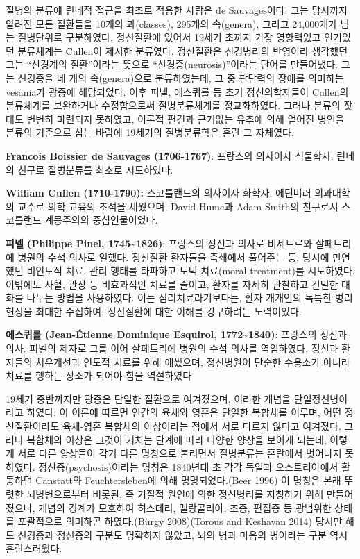 \documentclass[
]{article}
\begin{document}
질병의 분류에 린네적 접근을 최초로 적용한 사람은 de Sauvages이다. 그는
당시까지 알려진 모든 질환들을 10개의 과(classes), 295개의 속(genera),
그리고 24,000개가 넘는 질병단위로 구분하였다. 정신질환에 있어서 19세기
초까지 가장 영향력있고 인기있던 분류체계는 Cullen이 제시한 분류였다.
정신질환은 신경병리의 반영이라 생각했던 그는 ``신경계의 질환''이라는
뜻으로 ``신경증(neurosis)''이라는 단어를 만들어냈다. 그는 신경증을 네
개의 속(genera)으로 분류하였는데, 그 중 판단력의 장애를 의미하는
vesania가 광증에 해당되었다. 이후 피넬, 에스퀴롤 등 초기 정신의학자들이
Cullen의 분류체계를 보완하거나 수정함으로써 질병분류체계를 정교화하였다.
그러나 분류의 잣대도 변변히 마련되지 못하였고, 이론적 편견과 근거없는
유추에 의해 얻어진 병인을 분류의 기준으로 삼는 바람에 19세기의
질병분류학은 혼란 그 자체였다.

\textbf{Francois Boissier de Sauvages (1706-1767)}: 프랑스의 의사이자
식물학자. 린네의 친구로 질병분류를 최초로 시도하였다.

\textbf{William Cullen (1710-1790):} 스코틀랜드의 의사이자 화학자.
에딘버러 의과대학의 교수로 의학 교육의 초석을 세웠으며, David Hume과
Adam Smith의 친구로서 스코틀랜드 계몽주의의 중심인물이었다.

\textbf{피넬 (Philippe Pinel, 1745\textasciitilde1826)}: 프랑스의 정신과
의사로 비세트르와 살페트리에 병원의 수석 의사로 일했다. 정신질환
환자들을 족쇄에서 풀어주는 등, 당시에 만연헀던 비인도적 치료, 관리
행태를 타파하고 도덕 치료(moral treatment)를 시도하였다. 이밖에도 사혈,
관장 등 비효과적인 치료를 줄이고, 환자를 자세히 관찰하고 긴밀한 대화를
나누는 방법을 사용하였다. 이는 심리치료라기보다는, 환자 개개인의 독특한
병리현상을 최대한 수집하여, 정신질환에 대한 이해를 강구하려는
노력이었다.

\textbf{에스퀴롤 (Jean-Étienne Dominique Esquirol,
1772\textasciitilde1840)}: 프랑스의 정신과 의사. 피넬의 제자로 그를 이어
살페트리에 병원의 수석 의사를 역임하였다. 정신과 환자들의 처우개선과
인도적 치료를 위해 애썼으며, 정신병원이 단순한 수용소가 아니라 치료를
행하는 장소가 되어야 함을 역설하였다

19세기 중반까지만 광증은 단일한 질환으로 여겨졌으며, 이러한 개념을
단일정신병이라고 하였다. 이 이론에 따르면 인간의 육체와 영혼은 단일한
복합체를 이루며, 어떤 정신질환이라도 육체-영혼 복합체의 이상이라는
점에서 서로 다르지 않다고 여겨졌다. 그러나 복합체의 이상은 그것이 거치는
단계에 따라 다양한 양상을 보이게 되는데, 이렇게 서로 다른 양상들이 각기
다른 명칭으로 불리면서 질병분류는 혼란에서 벗어나지 못하였다.
정신증(psychosis)이라는 명칭은 1840년대 초 각각 독일과 오스트리아에서
활동하던 Canstatt와 Feuchtersleben에 의해 명명되었다.(Beer 1996) 이
명칭은 본래 뚜렷한 뇌병변으로부터 비롯된, 즉 기질적 원인에 의한
정신병리를 지칭하기 위해 만들어졌으나, 개념의 경계가 모호하여 히스테리,
멜랑콜리아, 조증, 편집증 등 광범위한 상태를 포괄적으로 의미하곤
하였다.(Bürgy 2008)(Torous and Keshavan 2014) 당시만 해도 신경증과
정신증의 구분도 명확하지 않았고, 뇌의 병과 마음의 병이라는 구분 역시
혼란스러웠다.
\end{document}
